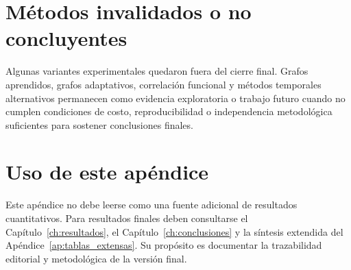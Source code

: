 \section{Métodos invalidados o no concluyentes}

Algunas variantes experimentales quedaron fuera del cierre final. Grafos aprendidos, grafos adaptativos, correlación funcional y métodos temporales alternativos permanecen como evidencia exploratoria o trabajo futuro cuando no cumplen condiciones de costo, reproducibilidad o independencia metodológica suficientes para sostener conclusiones finales.

\section{Uso de este apéndice}

Este apéndice no debe leerse como una fuente adicional de resultados cuantitativos. Para resultados finales deben consultarse el Capítulo~\ref{ch:resultados}, el Capítulo~\ref{ch:conclusiones} y la síntesis extendida del Apéndice~\ref{ap:tablas_extensas}. Su propósito es documentar la trazabilidad editorial y metodológica de la versión final.
